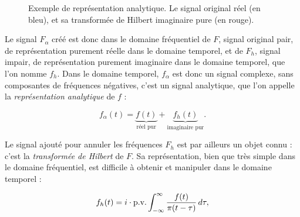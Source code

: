 \begin{figure}[h]
    \centering

    \caption[Signal analytique pour un signal complexe]{Exemple de représentation analytique. Le signal original réel (en bleu), et sa transformée de Hilbert imaginaire pure (en rouge).}
    \label{fig:analytic-representation}
\end{figure}


Le signal $F_{\alpha}$ créé est donc dans le domaine fréquentiel de $F$, signal original pair, de représentation purement réelle dans le domaine temporel, et de $F_h$, signal impair, de représentation purement imaginaire dans le domaine temporel, que l'on nomme $f_h$. Dans le domaine temporel, $f_{\alpha}$ est donc un signal complexe, sans composantes de fréquences négatives, c'est un signal analytique, que l'on appelle la \textit{représentation analytique} de $f$ :

\begin{equation}
    f_{\alpha}(t) = \underbrace{f(t)}_\text{réel pur} + \underbrace{f_h(t)}_\text{imaginaire pur}.
\end{equation}

Le signal ajouté pour annuler les fréquences $F_h$ est par ailleurs un objet connu : c'est la \textit{transformée de Hilbert} de $F$. Sa représentation, bien que très simple dans le domaine fréquentiel, est difficile à obtenir et manipuler dans le domaine temporel :

\begin{equation}
    f_h(t) = i \cdot \textnormal{p.v.} \int_{-\infty}^{\infty} \frac{f(t)}{\pi(t-\tau)} \,d\tau,
\end{equation}

